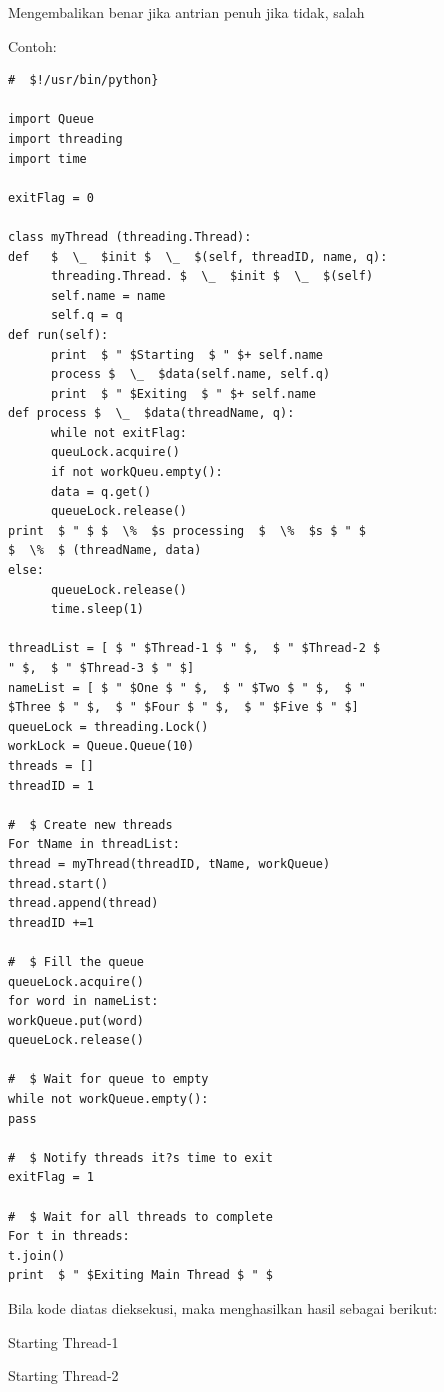 \begin{itemize}
\begin{itemize}
Mengembalikan benar jika antrian penuh jika tidak, salah
\end{itemize} 

\vspace{12pt} 
Contoh:  
\begin{verbatim}
#  $!/usr/bin/python}  

import Queue
import threading
import time
 
exitFlag = 0 

class myThread (threading.Thread): 
def   $  \_  $init $  \_  $(self, threadID, name, q):
      threading.Thread. $  \_  $init $  \_  $(self) 
      self.name = name
      self.q = q
def run(self):
      print  $ " $Starting  $ " $+ self.name
      process $  \_  $data(self.name, self.q) 
      print  $ " $Exiting  $ " $+ self.name 
def process $  \_  $data(threadName, q):
      while not exitFlag:
      queuLock.acquire()
      if not workQueu.empty(): 
      data = q.get() 
      queueLock.release() 
print  $ " $ $  \%  $s processing  $  \%  $s $ " $ 
$  \%  $ (threadName, data) 
else: 
      queueLock.release()
      time.sleep(1) 

threadList = [ $ " $Thread-1 $ " $,  $ " $Thread-2 $
" $,  $ " $Thread-3 $ " $]
nameList = [ $ " $One $ " $,  $ " $Two $ " $,  $ "
$Three $ " $,  $ " $Four $ " $,  $ " $Five $ " $]
queueLock = threading.Lock()
workLock = Queue.Queue(10)
threads = [] 
threadID = 1 
 
#  $ Create new threads
For tName in threadList: 
thread = myThread(threadID, tName, workQueue)
thread.start()
thread.append(thread)
threadID +=1

#  $ Fill the queue 
queueLock.acquire() 
for word in nameList:
workQueue.put(word) 
queueLock.release()
 
#  $ Wait for queue to empty
while not workQueue.empty(): 
pass 

#  $ Notify threads it?s time to exit
exitFlag = 1

#  $ Wait for all threads to complete
For t in threads:
t.join()
print  $ " $Exiting Main Thread $ " $
\end{verbatim}

\vspace{10pt} 
Bila kode diatas dieksekusi, maka menghasilkan hasil sebagai berikut: 
\vspace{12pt}
 
{\fontsize{10pt}{10pt}\selectfont Starting Thread-1} 
 
{\fontsize{10pt}{10pt}\selectfont Starting Thread-2} 
 

\end{itemize}

